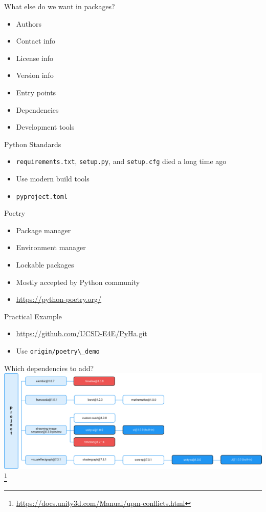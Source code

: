 \documentclass[aspectratio=169]{beamer}
\begin{document}
\begin{frame}{What else do we want in packages?}
    \begin{itemize}
        \item Authors
        \item Contact info
        \item License info
        \item Version info
        \item Entry points
        \item Dependencies
        \item Development tools
    \end{itemize}
\end{frame}
\begin{frame}{Python Standards}
    \begin{itemize}
        \item \lstinline!requirements.txt!, \lstinline!setup.py!, and \lstinline!setup.cfg! died a long time ago
        \item Use modern build tools
        \item \lstinline!pyproject.toml!
    \end{itemize}
\end{frame}
\begin{frame}{Poetry}
    \begin{itemize}
        \item Package manager
        \item Environment manager
        \item Lockable packages
        \item Mostly accepted by Python community
        \item \url{https://python-poetry.org/}
    \end{itemize}
\end{frame}
\begin{frame}{Practical Example}
    \begin{itemize}
        \item \url{https://github.com/UCSD-E4E/PyHa.git}
        \item Use \lstinline!origin/poetry\_demo!
    \end{itemize}
\end{frame}
\begin{frame}{Which dependencies to add?}
    \centering
    \includegraphics[width=\textwidth,height=0.8\textheight,keepaspectratio]{dependency_resolution.png} \footnote{\url{https://docs.unity3d.com/Manual/upm-conflicts.html}}
\end{frame}
\end{document}
